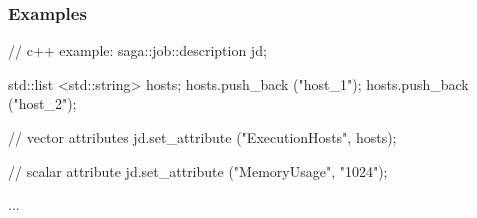  
 \subsubsection{Examples}
 
 \begin{mycode}
  // c++ example:
  saga::job::description jd;
 
  std::list <std::string> hosts;
  hosts.push_back ("host_1");
  hosts.push_back ("host_2");
 
  // vector attributes
  jd.set_attribute ("ExecutionHosts", hosts);
 
  // scalar attribute
  jd.set_attribute ("MemoryUsage", "1024");
 
  ...
 \end{mycode}
 
